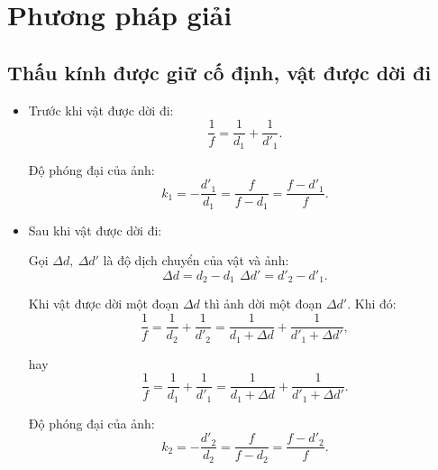 \section{Phương pháp giải}
\subsection{Thấu kính được giữ cố định, vật được dời đi}

		\begin{itemize}
			\item Trước khi vật được dời đi:  
		\begin{equation}
		\dfrac{1}{f}=\dfrac{1}{d_1}+\dfrac{1}{d'_1}.
		\end{equation}	
				
		 Độ phóng đại của ảnh: 
		 \begin{equation}
		 k_1=-\dfrac{d'_1}{d_1}=\dfrac{f}{f-d_1}=\dfrac{f-d'_1}{f}.
		 \end{equation}
		 
		 \item Sau khi vật được dời đi:
		 
		 Gọi $\Delta d, \ \Delta d'$ là độ dịch chuyển của vật và ảnh:
		 \begin{equation}
		  \Delta d=d_2-d_1\, \ \Delta d'=d'_2-d'_1.
		 \end{equation}
		 			 
		 Khi vật được dời một đoạn $\Delta d$ thì ảnh dời một đoạn $\Delta d'$. Khi đó:
		 \begin{equation}  
		  \dfrac{1}{f}=\dfrac{1}{d_2}+\dfrac{1}{d'_2}=\dfrac{1}{d_1+\Delta d}+\dfrac{1}{d'_1+\Delta d'},
		 \end{equation}
		
		 
		hay \begin{equation} \dfrac{1}{f}=\dfrac{1}{d_1}+\dfrac{1}{d'_1}=\dfrac{1}{d_1+\Delta d}+\dfrac{1}{d'_1+\Delta d'}.
		 \end{equation}
		 
		 Độ phóng đại của ảnh: 
		 \begin{equation}
		 k_2=-\dfrac{d'_2}{d_2}=\dfrac{f}{f-d_2}=\dfrac{f-d'_2}{f}.
		 \end{equation}
			\end{itemize}
	
